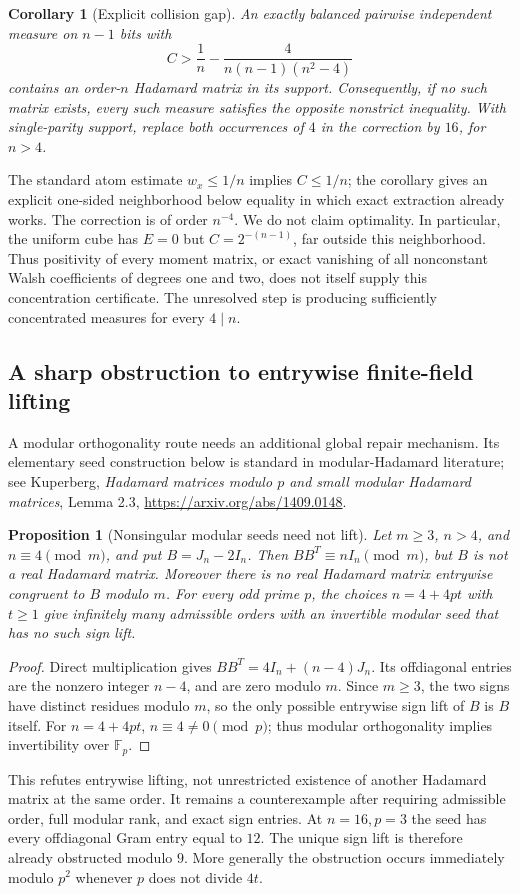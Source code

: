 \documentclass[11pt]{article}
\newtheorem{corollary}[theorem]{Corollary}
\newtheorem{proposition}[theorem]{Proposition}
\begin{document}
\begin{corollary}[Explicit collision gap]
\label{cor:discrete-gap}
An exactly balanced pairwise independent measure on $n-1$ bits with
\[
 C>\frac1n-\frac4{n(n-1)(n^2-4)}
\]
contains an order-$n$ Hadamard matrix in its support. Consequently,
if no such matrix exists, every such measure satisfies the opposite
nonstrict inequality. With single-parity support, replace both occurrences
of $4$ in the correction by $16$, for $n>4$.
\end{corollary}
The standard atom estimate $w_x\le1/n$ implies $C\le1/n$;
the corollary gives an explicit one-sided neighborhood below equality
in which exact extraction already works. The correction is of order
$n^{-4}$. We do not claim optimality. In particular, the uniform cube
has $E=0$ but $C=2^{-(n-1)}$, far outside this neighborhood.
Thus positivity of every moment matrix, or exact vanishing of all
nonconstant Walsh coefficients of degrees one and two, does not itself
supply this concentration certificate. The unresolved step is producing
sufficiently concentrated measures for every $4\mid n$.

\subsection{A sharp obstruction to entrywise finite-field lifting}
A modular orthogonality route needs an additional global repair mechanism.
Its elementary seed construction below is standard in modular-Hadamard
literature; see Kuperberg, \emph{Hadamard matrices modulo $p$ and small
modular Hadamard matrices}, Lemma 2.3,
\url{https://arxiv.org/abs/1409.0148}.
\begin{proposition}[Nonsingular modular seeds need not lift]
\label{prop:discrete-modular}
Let $m\ge3$, $n>4$, and $n\equiv4\pmod m$, and put $B=J_n-2I_n$.
Then $BB^T\equiv nI_n\pmod m$, but $B$ is not a real Hadamard matrix.
Moreover there is no real Hadamard matrix entrywise congruent to $B$
modulo $m$. For every odd prime $p$, the choices $n=4+4pt$ with $t\ge1$
give infinitely many admissible orders with an invertible modular seed
that has no such sign lift.
\end{proposition}
\begin{proof}
Direct multiplication gives $BB^T=4I_n+(n-4)J_n$.
Its offdiagonal entries are the nonzero integer $n-4$, and are zero
modulo $m$. Since $m\ge3$, the two signs have distinct residues modulo
$m$, so the only possible entrywise sign lift of $B$ is $B$ itself.
For $n=4+4pt$, $n\equiv4\ne0\pmod p$; thus modular orthogonality
implies invertibility over $\mathbb F_p$.
\end{proof}
This refutes entrywise lifting, not unrestricted existence of another
Hadamard matrix at the same order. It remains a counterexample after
requiring admissible order, full modular rank, and exact sign entries.
At $n=16,p=3$ the seed has every offdiagonal Gram entry equal to $12$.
The unique sign lift is therefore already obstructed modulo $9$.
More generally the obstruction occurs immediately modulo $p^2$ whenever
$p$ does not divide $4t$.
\end{document}

